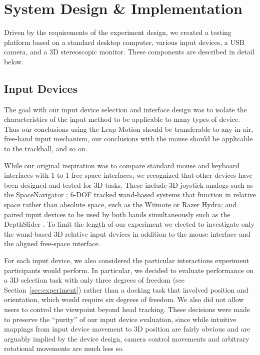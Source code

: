 \section{System Design \& Implementation}\label{sec:design}

Driven by the requirements of the experiment design, we created a testing
platform based on a standard desktop computer, various input devices, a USB
camera, and a 3D stereoscopic monitor.  These components are described in
detail below.

\subsection{Input Devices}
The goal with our input device selection and interface design was to isolate
the characteristics of the input method to be applicable to many types of
device.  Thus our conclusions using the Leap Motion should be transferable to
any in-air, free-hand input mechanism, our conclusions with the mouse should
be applicable to the trackball, and so on.

While our original inspiration was to compare standard mouse and keyboard
interfaces with 1-to-1 free space interfaces, we recognized that other devices
have been designed and tested for 3D tasks. These include 3D-joystick analogs
such as the SpaceNavigator \cite{mattheiss2011navigating}; 6-DOF tracked
wand-based systems that function in relative space rather than absolute space,
such as the Wiimote or Razer Hydra; and paired input devices to be used by both
hands simultaneously such as the DepthSlider \cite{study1}. To limit the length
of our experiment we elected to investigate only the wand-based 3D relative
input devices in addition to the mouse interface and the aligned free-space
interface.

For each input device, we also considered the particular interactions
experiment participants would perform. In particular, we decided to evaluate
performance on a 3D selection task with only three degrees of freedom (see
Section~\ref{sec:experiment}) rather than a docking task that involved
position and orientation, which would require six degrees of freedom. We also
did not allow users to control the viewpoint beyond head tracking. These
decisions were made to preserve the ``purity'' of our input device evaluation,
since while intuitive mappings from input device movement to 3D position are
fairly obvious and are arguably implied by the device design, camera control
movements and arbitrary rotational movements are much less so.

